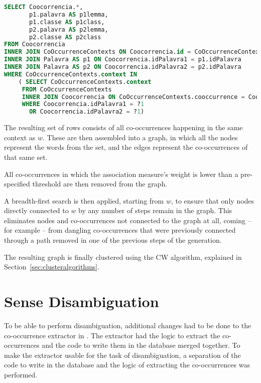 \begin{lstlisting}[language=SQL,float=h,caption=SQL Query to extract all
co-occurrences in same context as the target word,label=lst:contextextract]
SELECT Coocorrencia.*,
       p1.palavra AS p1lemma,
       p1.classe AS p1class,
       p2.palavra AS p2lemma,
       p2.classe AS p2class
FROM Coocorrencia
INNER JOIN CoOccurrenceContexts ON Coocorrencia.id = CoOccurrenceContexts.cooccurrence
INNER JOIN Palavra AS p1 ON Coocorrencia.idPalavra1 = p1.idPalavra
INNER JOIN Palavra AS p2 ON Coocorrencia.idPalavra2 = p2.idPalavra
WHERE CoOccurrenceContexts.context IN
    ( SELECT CoOccurrenceContexts.context
     FROM CoOccurrenceContexts
     INNER JOIN Coocorrencia ON CoOccurrenceContexts.cooccurrence = Coocorrencia.id
     WHERE Coocorrencia.idPalavra1 = ?1
       OR Coocorrencia.idPalavra2 = ?1)
\end{lstlisting}

The resulting set of rows consists of all co-occurrences happening in the same
context as $w$. These are then assembled into a graph, in which all the nodes
represent the words from the set, and the edges represent the co-occurrences of
that same set.

All co-occurrences in which the association measure's weight is lower than a
pre-specified threshold are then removed from the graph.

A breadth-first search is then applied, starting from $w$, to ensure that only 
nodes directly connected to $w$ by any number of steps remain in the graph. This
eliminates nodes and co-occurrences not connected to the graph at all, coming
-- for example -- from dangling co-occurrences that were previously connected
through a path removed in one of the previous steps of the generation.

The resulting graph is finally clustered using the \ac{CW} algorithm, explained
in Section~\ref{sec:clusteralgorithms}.

\section{Sense Disambiguation}

To be able to perform disambiguation, additional changes had to be done to the
co-occurrence extractor in \citep{correia2015syntax}. The extractor had the 
logic
to extract the co-occurrences and the code to write them in the database merged
together. To make the extractor usable for the task of disambiguation, a
separation of the code to write in the database and the logic of extracting the
co-occurrences was performed.

